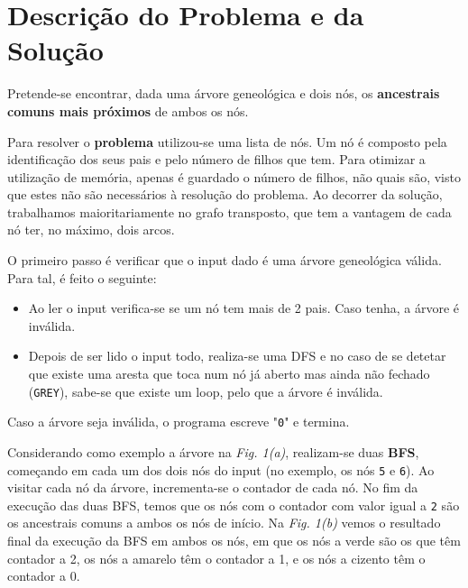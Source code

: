 \documentclass[12pt,a4paper]{article}
\begin{document}
  \section{Descrição do Problema e da Solução}

  Pretende-se encontrar, dada uma árvore geneológica e dois nós, os \textbf{ancestrais comuns mais próximos} de ambos os nós.

  Para resolver o \textbf{problema} utilizou-se uma lista de nós.
  Um nó é composto pela identificação dos seus pais e pelo número de filhos que tem.
  Para otimizar a utilização de memória, apenas é guardado o número de filhos, não quais são, visto que estes não são necessários à resolução do problema.
  Ao decorrer da solução, trabalhamos maioritariamente no grafo transposto, que tem a vantagem de cada nó ter, no máximo, dois arcos.

  O primeiro passo é verificar que o input dado é uma árvore geneológica válida.
  Para tal, é feito o seguinte:
  
  \begin{itemize}
    \setlength{\itemsep}{0pt}
      \item Ao ler o input verifica-se se um nó tem mais de 2 pais. Caso tenha, a árvore é inválida.
      \item Depois de ser lido o input todo, realiza-se uma DFS e no caso de se detetar que existe uma aresta que toca num nó já aberto mas ainda não fechado (\texttt{GREY}), sabe-se que existe um loop, pelo que a árvore é inválida.
  \end{itemize}

  Caso a árvore seja inválida, o programa escreve "\texttt{0}" e termina.

  Considerando como exemplo a árvore na \textit{Fig. 1(a)}, realizam-se duas \textbf{BFS}, começando em cada um dos dois nós do input (no exemplo, os nós \texttt{5} e \texttt{6}).
  Ao visitar cada nó da árvore, incrementa-se o contador de cada nó.
  No fim da execução das duas BFS, temos que os nós com o contador com valor igual a \texttt{2} são os ancestrais comuns a ambos os nós de início.
  Na \textit{Fig. 1(b)} vemos o resultado final da execução da BFS em ambos os nós, em que os nós a verde são os que têm contador a 2, os nós a amarelo têm o contador a 1, e os nós a cizento têm o contador a 0.
\end{document}
